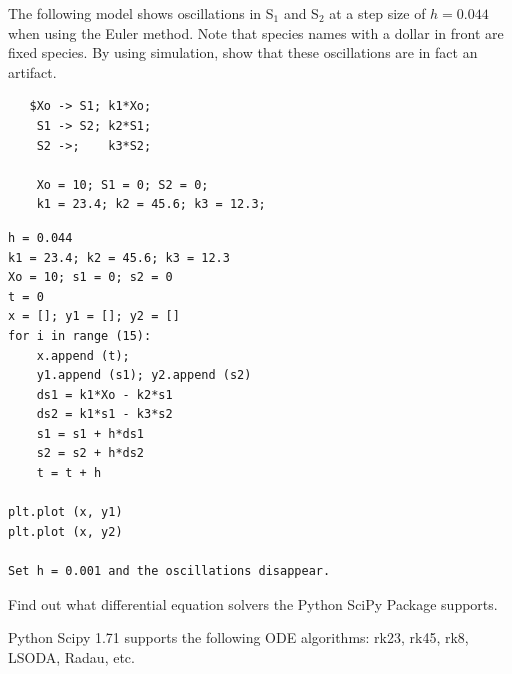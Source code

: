 \documentclass[12pt]{article}
\begin{document}
\cprotEnv\begin{question}
The following model shows oscillations in S$_1$ and S$_2$ at a step size of $h = 0.044$ when using the Euler method. Note that species names with a dollar in front are fixed species. By using simulation, show that these oscillations are in fact an artifact.

\begin{verbatim}
   $Xo -> S1; k1*Xo;
    S1 -> S2; k2*S1;
    S2 ->;    k3*S2;

    Xo = 10; S1 = 0; S2 = 0;
    k1 = 23.4; k2 = 45.6; k3 = 12.3;
\end{verbatim}
\end{question}
\cprotEnv\begin{solution}
\begin{verbatim}
h = 0.044
k1 = 23.4; k2 = 45.6; k3 = 12.3
Xo = 10; s1 = 0; s2 = 0
t = 0
x = []; y1 = []; y2 = []
for i in range (15):
    x.append (t);
    y1.append (s1); y2.append (s2)
    ds1 = k1*Xo - k2*s1
    ds2 = k1*s1 - k3*s2
    s1 = s1 + h*ds1
    s2 = s2 + h*ds2
    t = t + h

plt.plot (x, y1)
plt.plot (x, y2)

Set h = 0.001 and the oscillations disappear.
\end{verbatim}
\end{solution}



\begin{question}
Find out what differential equation solvers the Python SciPy Package supports.
\end{question}
\begin{solution}
Python Scipy 1.71 supports the following ODE algorithms: rk23, rk45, rk8, LSODA, Radau, etc.
\end{solution}
\end{document}

